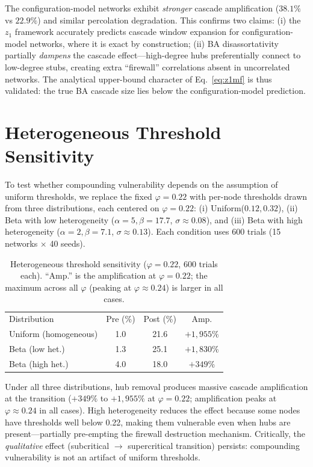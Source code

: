 \documentclass[aps,pre,twocolumn,superscriptaddress,showpacs]{revtex4-2}
\begin{document}
The configuration-model networks exhibit \emph{stronger} cascade amplification ($38.1\%$ vs $22.9\%$) and similar percolation degradation. This confirms two claims: (i) the $z_1$ framework accurately predicts cascade window expansion for configuration-model networks, where it is exact by construction; (ii) BA disassortativity partially \emph{dampens} the cascade effect---high-degree hubs preferentially connect to low-degree stubs, creating extra ``firewall'' correlations absent in uncorrelated networks. The analytical upper-bound character of Eq.~\ref{eq:z1mf} is thus validated: the true BA cascade size lies below the configuration-model prediction.

\section{Heterogeneous Threshold Sensitivity}
\label{app:hetero}

To test whether compounding vulnerability depends on the assumption of uniform thresholds, we replace the fixed $\varphi=0.22$ with per-node thresholds drawn from three distributions, each centered on $\varphi=0.22$: (i) Uniform($0.12, 0.32$), (ii) Beta with low heterogeneity ($\alpha=5, \beta=17.7$, $\sigma \approx 0.08$), and (iii) Beta with high heterogeneity ($\alpha=2, \beta=7.1$, $\sigma \approx 0.13$). Each condition uses 600 trials (15 networks $\times$ 40 seeds).

\begin{table}[h]
\caption{Heterogeneous threshold sensitivity ($\varphi=0.22$, 600 trials each). ``Amp.'' is the amplification at $\varphi=0.22$; the maximum across all $\varphi$ (peaking at $\varphi \approx 0.24$) is larger in all cases.}
\label{tab:hetero}
\begin{ruledtabular}
\begin{tabular}{lccc}
\textrm{Distribution} & \textrm{Pre (\%)} & \textrm{Post (\%)} & \textrm{Amp.} \\
\colrule
Uniform (homogeneous) & 1.0 & 21.6 & $+1{,}955\%$ \\
Beta (low het.) & 1.3 & 25.1 & $+1{,}830\%$ \\
Beta (high het.) & 4.0 & 18.0 & $+349\%$ \\
\end{tabular}
\end{ruledtabular}
\end{table}

Under all three distributions, hub removal produces massive cascade amplification at the transition ($+349\%$ to $+1{,}955\%$ at $\varphi=0.22$; amplification peaks at $\varphi \approx 0.24$ in all cases). High heterogeneity reduces the effect because some nodes have thresholds well below 0.22, making them vulnerable even when hubs are present---partially pre-empting the firewall destruction mechanism. Critically, the \emph{qualitative} effect (subcritical $\to$ supercritical transition) persists: compounding vulnerability is not an artifact of uniform thresholds.
\end{document}
